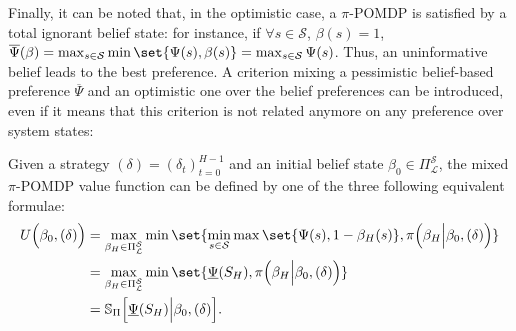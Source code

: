 Finally, it can be noted that, in the optimistic case, 
a $\pi$-POMDP is satisfied by a total ignorant belief state:
for instance, if $\forall s \in \mathcal{S}$, $\beta(s) = 1$,
$\overline{\Psi}(\beta) = \max_{s \in \mathcal{S}} \min \set{ \Psi(s), \beta(s) } = \max_{s \in \mathcal{S}} \Psi(s) $.
Thus, an uninformative belief leads to the best preference.
A criterion mixing a pessimistic belief-based preference $\overline{\Psi}$
and an optimistic one over the belief preferences 
can be introduced, even if it means that 
this criterion is not related anymore on any preference 
over system states:

\begin{Def}
\label{def_optpesscrit}
Given a strategy $(\delta)=(\delta_t)_{t=0}^{H-1}$
and an initial belief state $\beta_0 \in \Pi_{\mathcal{L}}^{\mathcal{S}}$,
the mixed $\pi$-POMDP value function can be defined by one of the three following equivalent formulae:
\begin{align}
U \Big( \beta_0, (\delta)  \Big) &= \max_{\beta_H \in \Pi^{\mathcal{S}}_{\mathcal{L}}} \min \set{ \min_{s \in \mathcal{S}} \max \set{ \Psi(s), 1 - \beta_H(s) }, \pi \Big( \beta_H \Big\vert \beta_0, (\delta) \Big) }\\ 
&= \max_{\beta_H \in \Pi^{\mathcal{S}}_{\mathcal{L}}} \min \set{\underline{\Psi}(S_H), \pi \Big( \beta_H \Big\vert \beta_0, (\delta) \Big) } \nonumber \\ 
&= \mathbb{S}_{\Pi} \Big[ \underline{\Psi}(S_H) \Big\vert \beta_0, (\delta) \Big] \nonumber.
\end{align}
\end{Def}

